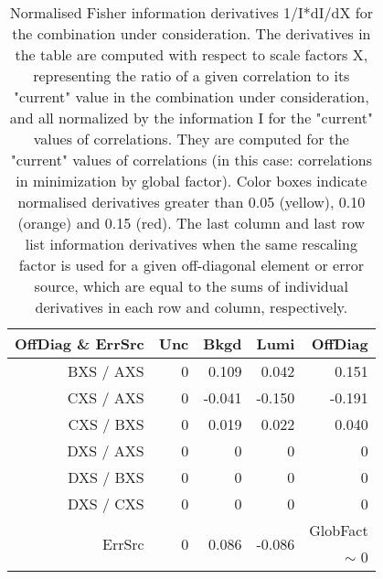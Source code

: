 \begin{table}[H]
\scriptsize
\begin{center}
\renewcommand{\arraystretch}{1.1}
\begin{tabular}{|r|rrr|r|}
\hline
 OffDiag \& ErrSrc & {\tiny Unc} & {\tiny Bkgd} & {\tiny Lumi} & OffDiag\\
\hline
BXS / AXS &  0 &  \colorbox{Orange1}{    0.109} &      0.042 &  \colorbox{Tomato1}{    0.151} \\
CXS / AXS &  0 &     -0.041 &     -0.150 &     -0.191 \\
CXS / BXS &  0 &      0.019 &      0.022 &      0.040 \\
DXS / AXS &  0 &  0 &  0 &  0 \\
DXS / BXS &  0 &  0 &  0 &  0 \\
DXS / CXS &  0 &  0 &  0 &  0 \\
\hline
\multirow{2}{*}{ErrSrc} & \multirow{2}{*}{ 0} & \multirow{2}{*}{ \colorbox{Yellow1}{    0.086}} & \multirow{2}{*}{    -0.086} & GlobFact\\
 & & & &  {\tiny $\sim$ }0 \\
\hline
\end{tabular}
\renewcommand{\arraystretch}{1}
\caption{Normalised Fisher information derivatives 1/I*dI/dX for the combination under consideration. The derivatives in the table are computed with respect to scale factors X, representing the ratio of a given correlation to its "current" value in the combination under consideration, and all normalized by the information I for the "current" values of correlations. They are computed for the "current" values of correlations (in this case: correlations in minimization by global factor). Color boxes indicate normalised derivatives greater than 0.05 (yellow), 0.10 (orange) and 0.15 (red). The last column and last row list information derivatives when the same rescaling factor is used for a given off-diagonal element or error source, which are equal to the sums of individual derivatives in each row and column, respectively.}
\end{center}
\end{table}
